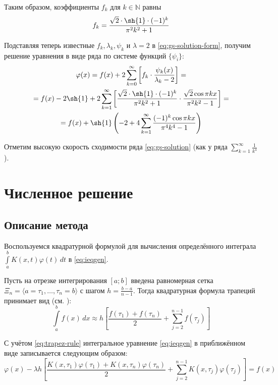 \documentclass{article}
\numberwithin{equation}{section}
\renewcommand{\phi}{\varphi}
\newcommand{\intl}{\int\limits}
\providecommand{\set}[1]{\mathbb{#1}}
\begin{document}
Таким образом, коэффициенты $f_k$ для $k \in \set{N}$ равны
\begin{equation}
  f_k = \frac{\sqrt{2} \cdot \sh{1}\cdot (-1)^k}{\pi^2 k^2 + 1}
\end{equation}

Подставляя теперь известные $f_k, \lambda_k, \psi_k$ и $\lambda = 2$ в
\eqref{eq:gs-solution-form}, получим решение уравнения в виде ряда по
системе функций $\{\psi_i\}$:
\begin{multline}
  \label{eq:gs-solution}
  \phi(x) = f(x) + 2 \sum_{k=0}^\infty \left [
    f_k\cdot\frac{\psi_k(x)}{\lambda_k-2} \right ] = \\
  = f(x) - 2 \sh{1} + 2 \sum_{k=1}^\infty\left [ \frac{\sqrt{2} \cdot
      \sh{1}\cdot (-1)^k}{\pi^2 k^2 + 1} \cdot \frac{\sqrt{2}\cos{\pi
        k x}}{\pi^2 k^2 - 1} \right ] = \\
  = f(x) + \sh{1} \left ( -2 + 4  \sum_{k=1}^\infty \frac{(-1)^k
      \cos{\pi k x}} {\pi^4 k^4 - 1} \right )
\end{multline}

Отметим высокую скорость сходимости ряда \eqref{eq:gs-solution} (как у
ряда $\sum \limits_{k=1}^\infty \frac{1}{k^4}$).

\clearpage
\section{Численное решение}
\label{sec:numeric}
\subsection{Описание метода}
Воспользуемся квадратурной формулой для вычисления определённого
интеграла $\intl_a^b {K(x, t) \phi(t)\,dt}$ в \eqref{eq:ieqgen}.

Пусть на отрезке интегрирования $[a; b]$ введена равномерная сетка
$\Xi_n = \langle a = \tau_1, \dotsc, \tau_n = b \rangle$ с шагом
$h = \frac{b-a}{n-1}$. Тогда квадратурная формула трапеций принимает
вид (см. \cite{bakhvalov01}):
\begin{equation}
  \label{eq:trapez-rule}
  \intl_a^b{f(x)\,dx} \approx h \left [ \frac{f(\tau_1)+f(\tau_n)}{2} +
    \sum_{j=2}^{n-1} f(\tau_j) \right ]
\end{equation}

С учётом \eqref{eq:trapez-rule} интегральное уравнение
\eqref{eq:ieqgen} в приближённом виде записывается следующим образом:
\begin{equation*}
  \phi(x) - \lambda h \left[ 
    \frac{K(x,\tau_1) \phi(\tau_1) + 
      K(x,\tau_n) \phi(\tau_n)}{2} + 
    \sum_{j=2}^{n-1} K(x, \tau_{j}) \phi(\tau_{j}) 
  \right] = f(x)
\end{equation*}
\end{document}
